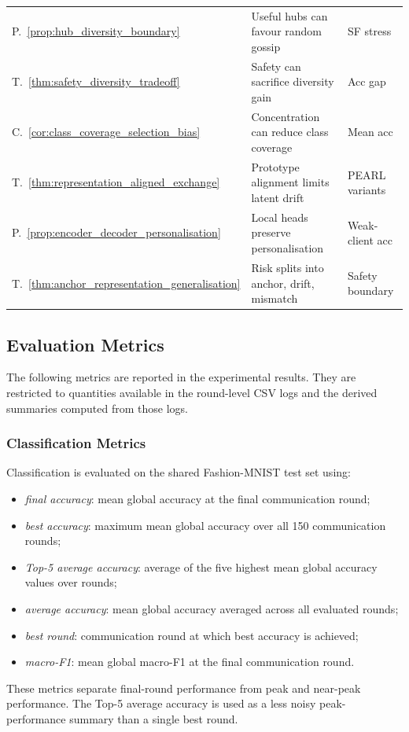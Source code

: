 \documentclass[conference]{IEEEtran}
\begin{document}
\begin{table}[t]
\begin{tabular}{p{}p{}p{}}
P.~\ref{prop:hub_diversity_boundary} & Useful hubs can favour random gossip & SF stress \\
T.~\ref{thm:safety_diversity_tradeoff} & Safety can sacrifice diversity gain & Acc gap \\
C.~\ref{cor:class_coverage_selection_bias} & Concentration can reduce class coverage & Mean acc \\
T.~\ref{thm:representation_aligned_exchange} & Prototype alignment limits latent drift & PEARL variants \\
P.~\ref{prop:encoder_decoder_personalisation} & Local heads preserve personalisation & Weak-client acc \\
T.~\ref{thm:anchor_representation_generalisation} & Risk splits into anchor, drift, mismatch & Safety boundary \\
\bottomrule
\end{tabular}
\end{table}

\subsection{Evaluation Metrics}
\label{subsec:evaluation-metrics}

The following metrics are reported in the experimental results. They are restricted to quantities available in the round-level CSV logs and the derived summaries computed from those logs.

\subsubsection{Classification Metrics}
\label{subsubsec:classification-metrics}
Classification is evaluated on the shared Fashion-MNIST test set using:
\begin{itemize}
    \item \emph{final accuracy}: mean global accuracy at the final communication round;
    \item \emph{best accuracy}: maximum mean global accuracy over all 150 communication rounds;
    \item \emph{Top-5 average accuracy}: average of the five highest mean global accuracy values over rounds;
    \item \emph{average accuracy}: mean global accuracy averaged across all evaluated rounds;
    \item \emph{best round}: communication round at which best accuracy is achieved;
    \item \emph{macro-F1}: mean global macro-F1 at the final communication round.
\end{itemize}
These metrics separate final-round performance from peak and near-peak performance. The Top-5 average accuracy is used as a less noisy peak-performance summary than a single best round.
\end{document}
